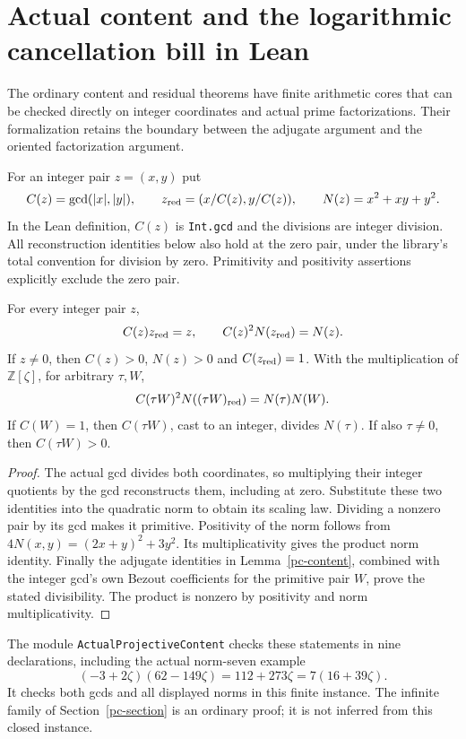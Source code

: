 \section{Actual content and the logarithmic cancellation bill in Lean}
\label{acr-section}

The ordinary content and residual theorems have finite arithmetic cores
that can be checked directly on integer coordinates and actual prime
factorizations. Their formalization retains the boundary between the
adjugate argument and the oriented factorization argument.

For an integer pair $z=(x,y)$ put
\[
 C(z)=\gcd(|x|,|y|),\qquad
 z_{\rm red}=(x/C(z),y/C(z)),\qquad N(z)=x^2+xy+y^2.
\]
In the Lean definition, $C(z)$ is \texttt{Int.gcd} and the divisions
are integer division. All reconstruction identities below also hold at
the zero pair, under the library's total convention for division by zero.
Primitivity and positivity assertions explicitly exclude the zero pair.

\begin{proposition}\label{acr-content-core}
For every integer pair $z$,
\[
 C(z)z_{\rm red}=z,\qquad C(z)^2N(z_{\rm red})=N(z).
\]
If $z\ne0$, then $C(z)>0$, $N(z)>0$ and $C(z_{\rm red})=1$.
With the multiplication of $\mathbb Z[\zeta]$, for arbitrary $\tau,W$,
\[
 C(\tau W)^2N((\tau W)_{\rm red})=N(\tau)N(W).
\]
If $C(W)=1$, then $C(\tau W)$, cast to an integer, divides $N(\tau)$.
If also $\tau\ne0$, then $C(\tau W)>0$.
\end{proposition}
\begin{proof}
The actual gcd divides both coordinates, so multiplying their integer
quotients by the gcd reconstructs them, including at zero. Substitute
these two identities into the quadratic norm to obtain its scaling law.
Dividing a nonzero pair by its gcd makes it primitive. Positivity of
the norm follows from $4N(x,y)=(2x+y)^2+3y^2$. Its multiplicativity
gives the product norm identity. Finally the adjugate identities in
Lemma~\ref{pc-content}, combined with the integer gcd's own Bezout
coefficients for the primitive pair $W$, prove the stated divisibility.
The product is nonzero by positivity and norm multiplicativity.
\end{proof}

The module \texttt{ActualProjectiveContent} checks these statements
in nine declarations, including the actual norm-seven example
\[
 (-3+2\zeta)(62-149\zeta)=112+273\zeta=7(16+39\zeta).
\]
It checks both gcds and all displayed norms in this finite instance.
The infinite family of Section~\ref{pc-section} is an ordinary proof;
it is not inferred from this closed instance.

